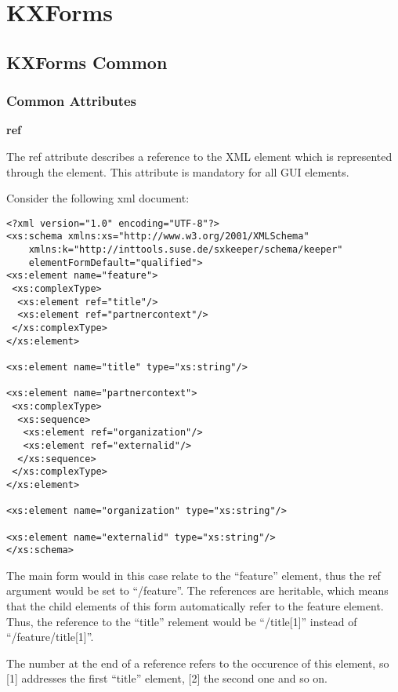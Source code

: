 


\chapter{ KXForms}

\section{ KXForms Common}

\subsection{ Common Attributes}
\label{commonattributes}

\begin{description}
 \item \textbf{ref} 

The ref attribute describes a reference to the XML element which is represented through the element. This attribute is mandatory for all GUI elements.

Consider the following xml document:

\begin{lstlisting}[caption=Example Schema]
<?xml version="1.0" encoding="UTF-8"?>
<xs:schema xmlns:xs="http://www.w3.org/2001/XMLSchema" 
    xmlns:k="http://inttools.suse.de/sxkeeper/schema/keeper" 
    elementFormDefault="qualified">
<xs:element name="feature">
 <xs:complexType>
  <xs:element ref="title"/>
  <xs:element ref="partnercontext"/>
 </xs:complexType>
</xs:element>

<xs:element name="title" type="xs:string"/>

<xs:element name="partnercontext">
 <xs:complexType>
  <xs:sequence>
   <xs:element ref="organization"/>
   <xs:element ref="externalid"/>
  </xs:sequence>
 </xs:complexType>
</xs:element>

<xs:element name="organization" type="xs:string"/>

<xs:element name="externalid" type="xs:string"/>
</xs:schema>
\end{lstlisting}


The main form would in this case relate to the ``feature'' element, thus the ref argument would be set to ``/feature''. The references are heritable, which means that the child elements of this form automatically refer to the feature element. Thus, the reference to the ``title'' relement would be ``/title[1]'' instead of ``/feature/title[1]''. 

The number at the end of a reference refers to the occurence of this element, so [1] addresses the first ``title'' element, [2] the second one and so on.


\end{description}
